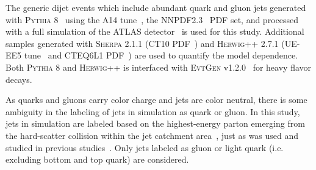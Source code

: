 The generic dijet events which include abundant quark and gluon jets generated with \textsc{Pythia} 8~\cite{Pythia,Pythia8} using the A14 tune~\cite{ATL-PHYS-PUB-2014-021}, the NNPDF2.3~\cite{Ball:2014uwa} PDF set, and processed with a full simulation of the ATLAS detector~\cite{Agostinelli:2002hh,Aad:2010ah} is used for this study.  Additional samples generated with \textsc{Sherpa} 2.1.1 (CT10 PDF~\cite{Gao:2013xoa}) and \textsc{Herwig++} 2.7.1 (UE-EE5 tune~\cite{Seymour:2013qka} and CTEQ6L1 PDF~\cite{Stump:2003yu}) are used to quantify the model dependence. Both \textsc{Pythia} 8 and \textsc{Herwig++} is interfaced with \textsc{EvtGen} v1.2.0~\cite{EvtGen} for heavy flavor decays.

As quarks and gluons carry color charge and jets are color neutral, 
there is some ambiguity in the labeling of jets in simulation as quark or gluon.
In this study, jets in simulation are 
labeled based on the highest-energy parton emerging from the hard-scatter collision within the jet catchment area~\cite{area}, 
just as was used and studied in previous studies~\cite{ATL-PHYS-PUB-2017-009}.
Only jets labeled as gluon or light quark (i.e. excluding bottom and top quark) are considered.
